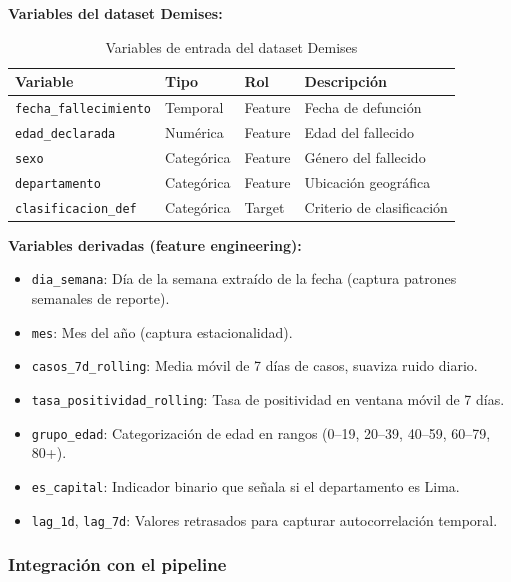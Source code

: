 \documentclass[12pt,a4paper]{article}
\begin{document}
\textbf{Variables del dataset Demises:}

\begin{table}[H]
    \centering
    \caption{Variables de entrada del dataset Demises}
    \begin{tabular}{@{}llll@{}}
        \toprule
        \textbf{Variable}             & \textbf{Tipo} & \textbf{Rol} & \textbf{Descripción}      \\
        \midrule
        \texttt{fecha\_fallecimiento} & Temporal      & Feature      & Fecha de defunción        \\
        \texttt{edad\_declarada}      & Numérica      & Feature      & Edad del fallecido        \\
        \texttt{sexo}                 & Categórica    & Feature      & Género del fallecido      \\
        \texttt{departamento}         & Categórica    & Feature      & Ubicación geográfica      \\
        \texttt{clasificacion\_def}   & Categórica    & Target       & Criterio de clasificación \\
        \bottomrule
    \end{tabular}
\end{table}

\textbf{Variables derivadas (feature engineering):}

\begin{itemize}
    \item \texttt{dia\_semana}: Día de la semana extraído de la fecha (captura patrones semanales de reporte).
    \item \texttt{mes}: Mes del año (captura estacionalidad).
    \item \texttt{casos\_7d\_rolling}: Media móvil de 7 días de casos, suaviza ruido diario.
    \item \texttt{tasa\_positividad\_rolling}: Tasa de positividad en ventana móvil de 7 días.
    \item \texttt{grupo\_edad}: Categorización de edad en rangos (0--19, 20--39, 40--59, 60--79, 80+).
    \item \texttt{es\_capital}: Indicador binario que señala si el departamento es Lima.
    \item \texttt{lag\_1d}, \texttt{lag\_7d}: Valores retrasados para capturar autocorrelación temporal.
\end{itemize}

\subsubsection{Integración con el pipeline}\label{integraciuxf3n-con-el-pipeline}
\end{document}
